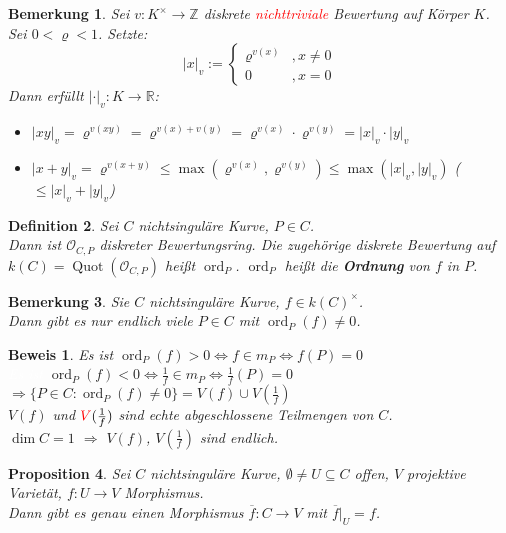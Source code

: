 \documentclass[a4paper,12pt]{report}
\theoremstyle{break}
\newtheorem{Def}{Definition}[section]
\newtheorem{Bem}[Def]{Bemerkung}
\newtheorem{Prop}[Def]{Proposition}
\theoremstyle{nonumberbreak}
\newtheorem{Bew}{Beweis}
\theoremstyle{nonumberplain}
\newcommand{\emp}[1]{\textbf{\emph{#1}}}
\newcommand{\begriff}[1]{{\index{#1}}\emp{#1}}
\DeclareMathOperator{\Quot}{Quot}
\DeclareMathOperator{\ord}{ord}
\newcommand{\R}{\mathbb{R}}
\newcommand{\Z}{\mathbb{Z}}
\newcommand{\calO}{\mathcal{O}}
\newcommand{\X}{\times}
\begin{document}
\begin{Bem}
Sei $v:K^\X\to\Z$ diskrete \textcolor{red}{nichttriviale} Bewertung auf K\"orper $K$. Sei $0<\varrho<1$. Setzte:
	\[|x|_v:=\left\{\begin{array}{lr}\varrho^{v(x)} & ,x\ne 0\\0 & ,x=0\end{array}\right.\]
Dann erf\"ullt $|\cdot|_v:K\to\R$:\begin{itemize}
\item$|xy|_v=\varrho^{v(xy)}=\varrho^{v(x)+v(y)}=\varrho^{v(x)}\cdot\varrho^{v(y)}=|x|_v\cdot|y|_v$
\item$|x+y|_v=\varrho^{v(x+y)}\le\max(\varrho^{v(x)},\varrho^{v(y)})\le\max(|x|_v,|y|_v)$ ($\le|x|_v+|y|_v$)
\end{itemize}\end{Bem}

\begin{Def}
Sei $C$ nichtsingul\"are Kurve, $P\in C$.\\
Dann ist $\calO_{C,P}$ diskreter Bewertungsring. Die zugeh\"orige diskrete Bewertung auf $k(C)=\Quot(\calO_{C,P})$ hei\ss t $\ord_P$. $\ord_P$ hei\ss t die \begriff{Ordnung} von $f$ in $P$.
\end{Def}

\begin{Bem}\label{20.8}
Sie $C$ nichtsingul\"are Kurve, $f\in k(C)^\X$.\\
Dann gibt es nur endlich viele $P\in C$ mit $\ord_P(f)\ne0$.
\end{Bem}

\begin{Bew}
Es ist $\ord_P(f) > 0 \Leftrightarrow f \in m_P \Leftrightarrow f(P)=0$\\
\textcolor{white}{Es ist} $\ord_P(f) < 0 \Leftrightarrow \frac{1}{f} \in m_P \Leftrightarrow \frac{1}{f}(P)=0$\\
$\Rightarrow \{P\in C: \ord_P(f)\ne0\} = V(f)\cup V(\frac{1}{f})$\\
$V(f)$ und $\textcolor{red}{V}(\frac{1}{f})$ sind echte abgeschlossene Teilmengen von $C$.\\
$\dim C=1$ $\Rightarrow$ $V(f)$, $V(\frac{1}{f})$ sind endlich.
\end{Bew}

\begin{Prop}\label{20.9}
Sei $C$ nichtsingul\"are Kurve, $\emptyset\ne U\subseteq C$ offen, $V$ projektive Variet\"at, $f:U\to V$ Morphismus.\\
Dann gibt es genau einen Morphismus $\overline{f}:C\to V$ mit $\overline{f}|_U=f$.
\end{Prop}
\end{document}
